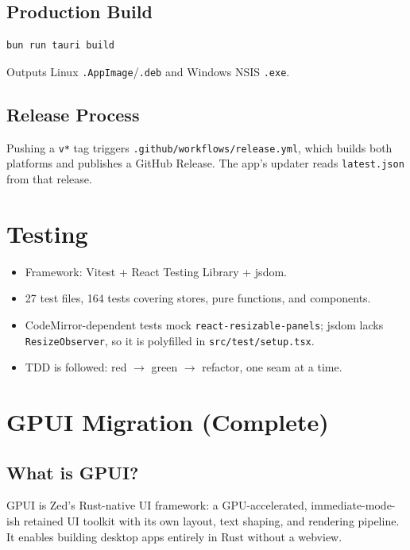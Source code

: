 \documentclass[11pt,a4paper]{report}
\begin{document}
\section{Production Build}
\begin{lstlisting}[language=bash]
bun run tauri build
\end{lstlisting}
Outputs Linux \texttt{.AppImage}/\texttt{.deb} and Windows NSIS \texttt{.exe}.

\section{Release Process}
Pushing a \texttt{v*} tag triggers \texttt{.github/workflows/release.yml}, which builds both platforms and publishes a GitHub Release. The app's updater reads \texttt{latest.json} from that release.

\chapter{Testing}

\begin{itemize}
  \item Framework: Vitest + React Testing Library + jsdom.
  \item 27 test files, 164 tests covering stores, pure functions, and components.
  \item CodeMirror-dependent tests mock \texttt{react-resizable-panels}; jsdom lacks \texttt{ResizeObserver}, so it is polyfilled in \texttt{src/test/setup.tsx}.
  \item TDD is followed: red $\rightarrow$ green $\rightarrow$ refactor, one seam at a time.
\end{itemize}

\chapter{GPUI Migration (Complete)}

\section{What is GPUI?}
GPUI is Zed's Rust-native UI framework: a GPU-accelerated, immediate-mode-ish retained UI toolkit with its own layout, text shaping, and rendering pipeline. It enables building desktop apps entirely in Rust without a webview.
\end{document}
